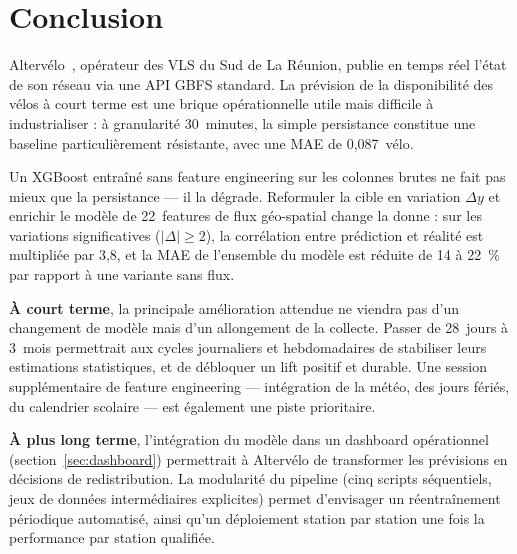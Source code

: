 \documentclass[fleqn, 12pt]{scrartcl}
\newcommand{\ent}{Altervélo\xspace}
\begin{document}
\newpage

\section{Conclusion}
\label{sec:conclusion}

\ent~\cite{altervelo}, opérateur des VLS du Sud de La Réunion, publie en temps réel l'état de son réseau via une API GBFS standard. La prévision de la disponibilité des vélos à court terme est une brique opérationnelle utile mais difficile à industrialiser : à granularité 30~minutes, la simple persistance constitue une baseline particulièrement résistante, avec une MAE de 0{,}087~vélo.

\vspace{0.3cm}

Un XGBoost entraîné sans feature engineering sur les colonnes brutes ne fait pas mieux que la persistance --- il la dégrade. Reformuler la cible en variation $\Delta y$ et enrichir le modèle de 22~features de flux géo-spatial change la donne : sur les variations significatives ($|\Delta| \geq 2$), la corrélation entre prédiction et réalité est multipliée par 3{,}8, et la MAE de l'ensemble du modèle est réduite de 14 à 22~\% par rapport à une variante sans flux.

\vspace{0.3cm}

\textbf{À court terme}, la principale amélioration attendue ne viendra pas d'un changement de modèle mais d'un allongement de la collecte. Passer de 28~jours à 3~mois permettrait aux cycles journaliers et hebdomadaires de stabiliser leurs estimations statistiques, et de débloquer un lift positif et durable. Une session supplémentaire de feature engineering --- intégration de la météo, des jours fériés, du calendrier scolaire --- est également une piste prioritaire.

\vspace{0.3cm}

\textbf{À plus long terme}, l'intégration du modèle dans un dashboard opérationnel (section~\ref{sec:dashboard}) permettrait à \ent de transformer les prévisions en décisions de redistribution. La modularité du pipeline (cinq scripts séquentiels, jeux de données intermédiaires explicites) permet d'envisager un réentraînement périodique automatisé, ainsi qu'un déploiement station par station une fois la performance par station qualifiée.
\end{document}
